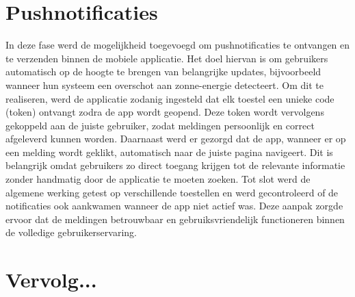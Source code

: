 \section{Pushnotificaties}
In deze fase werd de mogelijkheid toegevoegd om pushnotificaties te ontvangen en te verzenden binnen de mobiele applicatie. Het doel hiervan is om gebruikers automatisch op de hoogte te brengen van belangrijke updates, bijvoorbeeld wanneer hun systeem een overschot aan zonne-energie detecteert. Om dit te realiseren, werd de applicatie zodanig ingesteld dat elk toestel een unieke code (token) ontvangt zodra de app wordt geopend. Deze token wordt vervolgens gekoppeld aan de juiste gebruiker, zodat meldingen persoonlijk en correct afgeleverd kunnen worden.
Daarnaast werd er gezorgd dat de app, wanneer er op een melding wordt geklikt, automatisch naar de juiste pagina navigeert. Dit is belangrijk omdat gebruikers zo direct toegang krijgen tot de relevante informatie zonder handmatig door de applicatie te moeten zoeken.
Tot slot werd de algemene werking getest op verschillende toestellen en werd gecontroleerd of de notificaties ook aankwamen wanneer de app niet actief was. Deze aanpak zorgde ervoor dat de meldingen betrouwbaar en gebruiksvriendelijk functioneren binnen de volledige gebruikerservaring.

\section{Vervolg...}







